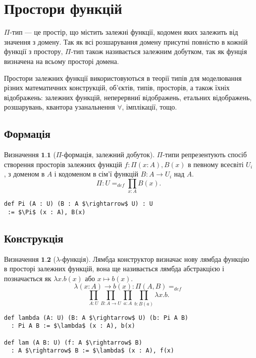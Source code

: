 \documentclass{article}
\theoremstyle{definition}
\begin{document}
\newpage

\section{Простори функцій}
$\Pi$-тип — це простір, що містить залежні функції, кодомен яких залежить від значення
з домену. Так як всі розшарування домену присутні повністю в кожній функції з простору,
$\Pi$-тип також називається залежним добутком, так як фунція визначена на всьому просторі домена.

Простори залежних функції використовуються в теорії типів для моделювання різних
математичних конструкцій, об'єктів, типів, просторів, а також їхніх відображень:
залежних функцій, неперервниї відображень, етальних відображень, розшарувань, квантора
узанальнення $\forall$, імплікації, тощо.

 \subsection{Формація}

$\textbf{Визначення\ 1.1}$ ($\Pi$-формація, залежний добуток).
$\Pi$-типи репрезентують спосіб створення просторів залежних функцій  $f: \Pi(x:A), B(x)$ в певному всесвіті $U_i$,
з доменом в $A$ і кодоменом в сім'ї функцій $B : A \rightarrow U_i$ над $A$.
$$
   \Pi : U =_{def} \prod_{x:A}B(x).
$$
\begin{lstlisting}[mathescape=true]
def Pi (A : U) (B : A $\rightarrow$ U) : U
 := $\Pi$ (x : A), B(x)
\end{lstlisting}

\subsection{Конструкція}

$\textbf{Визначення\ 1.2}$ ($\lambda$-функція).
Лямбда конструктор визначає нову лямбда функцію в просторі залежних функцій,
вона ще називається лямбда абстракцією і позначається як $\lambda x. b(x)$ або $x \mapsto b(x)$.
$$
    \lambda (x: A) \rightarrow b(x) : \Pi(A,B) =_{def}
$$
$$
    \prod_{A:U}\prod_{B:A \rightarrow U}\prod_{a: A}\prod_{b:B(a)}\lambda x.b.
$$
\begin{lstlisting}[mathescape=true]
def lambda (A: U) (B: A $\rightarrow$ U) (b: Pi A B)
  : Pi A B := $\lambda$ (x : A), b(x)

def lam (A B: U) (f: A $\rightarrow$ B)
  : A $\rightarrow$ B := $\lambda$ (x : A), f(x)
\end{lstlisting}
\end{document}
